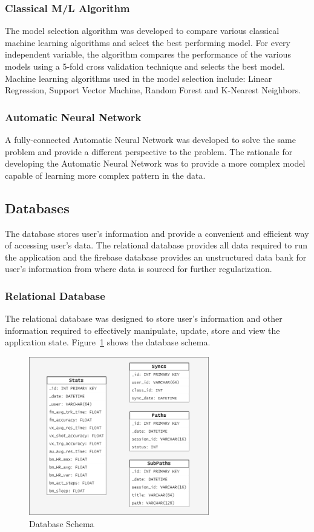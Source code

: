 \subsubsection{Classical M/L Algorithm} 
The model selection algorithm was developed to compare various classical machine learning algorithms and select the best performing model. For
every independent variable, the algorithm compares the performance of the various models using a 5-fold cross validation technique and selects
the best model. Machine learning algorithms used in the model selection include: Linear Regression, Support Vector Machine, Random Forest and 
K-Nearest Neighbors. 

\subsubsection{Automatic Neural Network}

A fully-connected Automatic Neural Network was developed to solve the same problem and provide a different perspective to the problem. The
rationale for developing the Automatic Neural Network was to provide a more complex model capable of learning more complex pattern in the data.


\subsection{Databases}
The database stores user's information and provide a convenient and efficient way of accessing user's data. The relational database provides all
data required to run the application and the firebase database provides an unstructured data bank for user's information from where data is sourced
for further regularization. 
\subsubsection{Relational Database}
The relational database was designed to store user's information and other information required to effectively manipulate, update, store and view 
the application state. Figure~\ref{image:db_schema} shows the database schema. 
\begin{figure}[h!]
    \centering
    \includegraphics[width=0.7\textwidth]{images/db_schema.png}
    \caption{Database Schema}
    \label{image:db_schema}
\end{figure}
